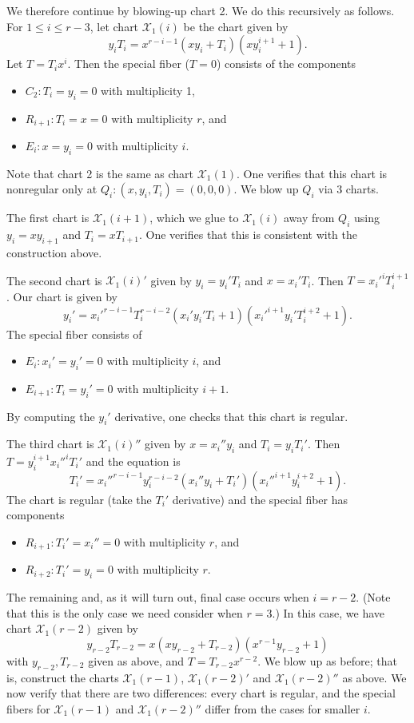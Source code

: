 \documentclass[reqno]{amsart}
\theoremstyle{definition}
\theoremstyle{remark}
\def\XX{\mathcal{X}}
\begin{document}
We therefore continue by blowing-up chart 2. We do this recursively as follows. For $1 \leq i \leq r-3$, let chart $\XX_1(i)$ be the chart given by
  \[
  y_i T_i = x^{r-i-1} (x y_i + T_i) (x y_i^{i+1} + 1).
  \]
  Let $T = T_i x^i$. Then the special fiber ($T = 0$) consists of the components
  \begin{itemize}
      \item $C_2: T_i = y_i = 0$ with multiplicity 1,
      \item $R_{i+1}: T_i = x = 0$ with multiplicity $r$, and
      \item $E_i: x = y_i = 0$ with multiplicity $i$.
  \end{itemize}
  Note that chart 2 is the same as chart $\XX_1(1)$. One verifies that this chart is nonregular only at $Q_i: (x, y_i, T_i) = (0, 0, 0)$. We blow up $Q_i$ via 3 charts.

  The first chart is $\XX_1(i+1)$, which we glue to $\XX_1(i)$ away from $Q_i$ using $y_i = x y_{i+1}$ and $T_i = x T_{i+1}$. One verifies that this is consistent with the construction above.

  The second chart is $\XX_1(i)'$ given by $y_i = y_i' T_i$ and $x = x_i' T_i$. Then $T = x_i'^i T_i^{i+1}$. Our chart is given by
  \[
  y_i' = x_i'^{r-i-1} T_i^{r-i-2} (x_i' y_i' T_i + 1) (x_i'^{i+1} y_i' T_i^{i+2} + 1).
  \]
  The special fiber consists of
  \begin{itemize}
      \item $E_i: x_i' = y_i' = 0$ with multiplicity $i$, and
      \item $E_{i+1}: T_i = y_i' = 0$ with multiplicity $i+1$.
  \end{itemize}
  By computing the $y_i'$ derivative, one checks that this chart is regular.

  The third chart is $\XX_1(i)''$ given by $x = x_i'' y_i$ and $T_i = y_i T_i'$. Then $T = y_i^{i+1} x_i''^i T_i'$ and the equation is
  \[
  T_i' = x_i''^{r-i-1} y_i^{r-i-2} (x_i'' y_i + T_i') (x_i''^{i+1} y_i^{i+2} + 1).
  \]
  The chart is regular (take the $T_i'$ derivative) and the special fiber has components
  \begin{itemize}
      \item $R_{i+1}: T_i' = x_i'' = 0$ with multiplicity $r$, and
      \item $R_{i+2}: T_i' = y_i = 0$ with multiplicity $r$.
  \end{itemize}

  The remaining and, as it will turn out, final case occurs when $i = r - 2$. (Note that this is the only case we need consider when $r = 3$.) In this case, we have chart $\XX_1(r-2)$ given by
  \[
  y_{r-2} T_{r-2} = x (x y_{r-2} + T_{r-2}) (x^{r-1} y_{r-2} + 1)
  \]
  with $y_{r-2}, T_{r-2}$ given as above, and $T = T_{r-2} x^{r-2}$. We blow up as before; that is, construct the charts $\XX_1(r-1)$, $\XX_1(r-2)'$ and $\XX_1(r-2)''$ as above. We now verify that there are two differences: every chart is regular, and the special fibers for $\XX_1(r-1)$ and $\XX_1(r-2)''$ differ from the cases for smaller $i$.
\end{document}
